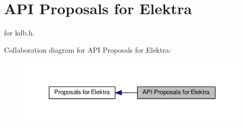 \hypertarget{group__api}{\section{A\+P\+I Proposals for Elektra}
\label{group__api}
}


for kdb.\+h.  


Collaboration diagram for A\+P\+I Proposals for Elektra\+:
\nopagebreak
\begin{figure}[H]
\begin{center}
\leavevmode
\includegraphics[width=347pt]{group__api}
\end{center}
\end{figure}
